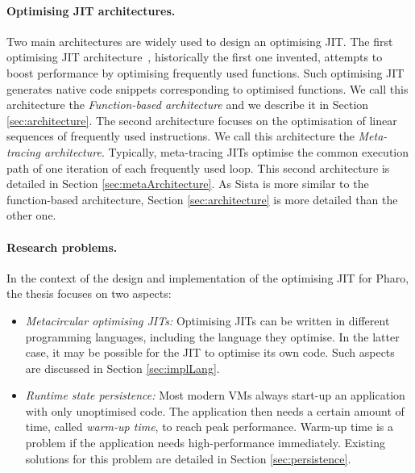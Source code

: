 \documentclass[a4paper,12pt,twoside]{../includes/ThesisStyle}
\begin{document}
\paragraph{Optimising JIT architectures.} Two main architectures are widely used to design an optimising JIT. The first optimising JIT architecture~\cite{UrsPHD}, historically the first one invented, attempts to boost performance by optimising frequently used functions. Such optimising JIT generates native code snippets corresponding to optimised functions. We call this architecture the \emph{Function-based architecture} and we describe it in Section \ref{sec:architecture}. The second architecture focuses on the optimisation of linear sequences of frequently used instructions. We call this architecture the \emph{Meta-tracing architecture}. Typically, meta-tracing JITs optimise the common execution path of one iteration of each frequently used loop. This second architecture is detailed in Section \ref{sec:metaArchitecture}. As Sista is more similar to the function-based architecture, Section \ref{sec:architecture} is more detailed than the other one.

\paragraph{Research problems.} In the context of the design and implementation of the optimising JIT for Pharo, the thesis focuses on 
two
aspects:
\begin{itemize}
	\item \emph{Metacircular optimising JITs: } Optimising JITs can be written in different programming languages, including the language they optimise. In the latter case, it may be possible for the JIT to optimise its own code. Such aspects are discussed in Section \ref{sec:implLang}.
	\item \emph{Runtime state persistence:} Most modern VMs always start-up an application with only unoptimised code. The application then needs a certain amount of time, called \emph{warm-up time}, to reach peak performance. Warm-up time is a problem if the application needs high-performance immediately. Existing solutions for this problem are detailed in Section \ref{sec:persistence}.
\end{itemize}
\end{document}
